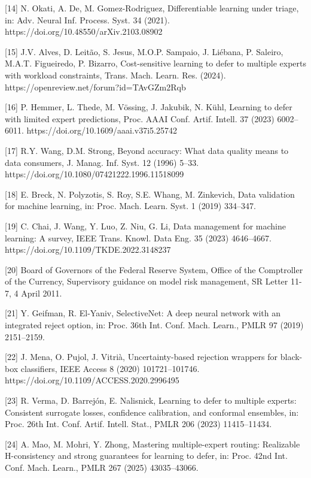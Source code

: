 \documentclass[
  11pt,
]{article}
\begin{document}
{[}14{]} N. Okati, A. De, M. Gomez-Rodriguez, Differentiable learning
under triage, in: Adv. Neural Inf. Process. Syst. 34 (2021).
https://doi.org/10.48550/arXiv.2103.08902

{[}15{]} J.V. Alves, D. Leitão, S. Jesus, M.O.P. Sampaio, J. Liébana, P.
Saleiro, M.A.T. Figueiredo, P. Bizarro, Cost-sensitive learning to defer
to multiple experts with workload constraints, Trans. Mach. Learn. Res.
(2024). https://openreview.net/forum?id=TAvGZm2Rqb

{[}16{]} P. Hemmer, L. Thede, M. Vössing, J. Jakubik, N. Kühl, Learning
to defer with limited expert predictions, Proc. AAAI Conf. Artif.
Intell. 37 (2023) 6002--6011. https://doi.org/10.1609/aaai.v37i5.25742

{[}17{]} R.Y. Wang, D.M. Strong, Beyond accuracy: What data quality
means to data consumers, J. Manag. Inf. Syst. 12 (1996) 5--33.
https://doi.org/10.1080/07421222.1996.11518099

{[}18{]} E. Breck, N. Polyzotis, S. Roy, S.E. Whang, M. Zinkevich, Data
validation for machine learning, in: Proc. Mach. Learn. Syst. 1 (2019)
334--347.

{[}19{]} C. Chai, J. Wang, Y. Luo, Z. Niu, G. Li, Data management for
machine learning: A survey, IEEE Trans. Knowl. Data Eng. 35 (2023)
4646--4667. https://doi.org/10.1109/TKDE.2022.3148237

{[}20{]} Board of Governors of the Federal Reserve System, Office of the
Comptroller of the Currency, Supervisory guidance on model risk
management, SR Letter 11-7, 4 April 2011.

{[}21{]} Y. Geifman, R. El-Yaniv, SelectiveNet: A deep neural network
with an integrated reject option, in: Proc. 36th Int. Conf. Mach.
Learn., PMLR 97 (2019) 2151--2159.

{[}22{]} J. Mena, O. Pujol, J. Vitrià, Uncertainty-based rejection
wrappers for black-box classifiers, IEEE Access 8 (2020) 101721--101746.
https://doi.org/10.1109/ACCESS.2020.2996495

{[}23{]} R. Verma, D. Barrejón, E. Nalisnick, Learning to defer to
multiple experts: Consistent surrogate losses, confidence calibration,
and conformal ensembles, in: Proc. 26th Int. Conf. Artif. Intell. Stat.,
PMLR 206 (2023) 11415--11434.

{[}24{]} A. Mao, M. Mohri, Y. Zhong, Mastering multiple-expert routing:
Realizable H-consistency and strong guarantees for learning to defer,
in: Proc. 42nd Int. Conf. Mach. Learn., PMLR 267 (2025) 43035--43066.
\end{document}
